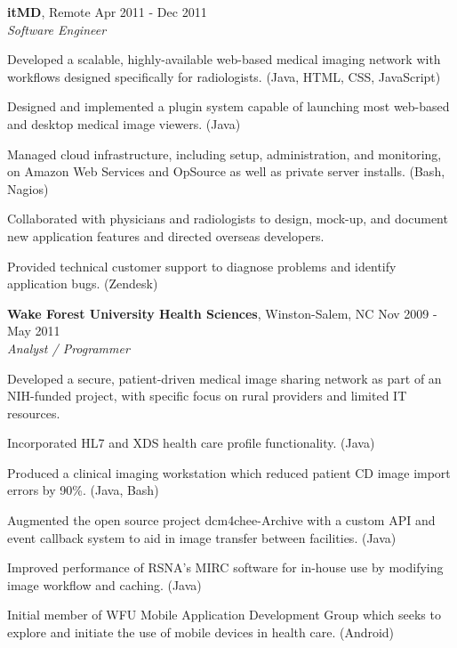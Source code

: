 \documentclass[margin,line]{resume}
\begin{document}
\begin{resume}
  \textbf{itMD}, Remote \hfill Apr 2011 - Dec 2011\vspace{1mm}\\
  \textsl{Software Engineer}\\
  \vspace{-3mm}
  \begin{list2}
\item Developed a scalable, highly-available web-based medical imaging network with
  workflows designed specifically for radiologists. (Java, HTML, CSS,
  JavaScript)
\item Designed and implemented a plugin system capable of launching most web-based
  and desktop medical image viewers. (Java)
\item Managed cloud infrastructure, including setup, administration, and
  monitoring, on Amazon Web Services and OpSource as well as private server
  installs. (Bash, Nagios)
\item Collaborated with physicians and radiologists to design, mock-up, and
  document new application features and directed overseas developers.
\item Provided technical customer support to diagnose problems and identify
  application bugs. (Zendesk)
  \end{list2}

  \textbf{Wake Forest University Health Sciences}, Winston-Salem, NC \hfill Nov 2009 - May 2011\vspace{1mm}\\
  \textsl{Analyst / Programmer}\\
  \vspace{-3mm}
  \begin{list2}
\item Developed a secure, patient-driven medical image sharing network as part of
  an NIH-funded project, with specific focus on rural providers and limited
  IT resources.
\item Incorporated HL7 and XDS health care profile functionality. (Java)
\item Produced a clinical imaging workstation which reduced patient CD image import
  errors by 90\%. (Java, Bash)
\item Augmented the open source project dcm4chee-Archive with a custom API and
  event callback system to aid in image transfer between facilities. (Java)
\item Improved performance of RSNA's MIRC software for in-house use by modifying
  image workflow and caching. (Java)
\item Initial member of WFU Mobile Application Development Group which seeks to
  explore and initiate the use of mobile devices in health care. (Android)
  \end{list2}


\end{resume}
\end{document}
